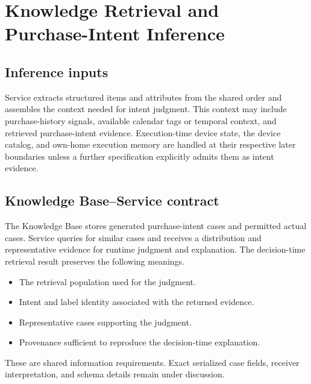 \section{Knowledge Retrieval and Purchase-Intent Inference}
\label{sec:inference}

\subsection{Inference inputs}

Service extracts structured items and attributes from the shared order and
assembles the context needed for intent judgment. This context may include
purchase-history signals, available calendar tags or temporal context, and
retrieved purchase-intent evidence. Execution-time device state, the device
catalog, and own-home execution memory are handled at their respective later
boundaries unless a further specification explicitly admits them as intent
evidence. 

\subsection{Knowledge Base--Service contract}

The Knowledge Base stores generated purchase-intent cases and permitted
actual cases. Service queries for similar cases and receives a distribution
and representative evidence for runtime judgment and explanation. The
decision-time retrieval result preserves the following meanings.

\begin{itemize}
  \item The retrieval population used for the judgment.
  \item Intent and label identity associated with the returned evidence.
  \item Representative cases supporting the judgment.
  \item Provenance sufficient to reproduce the decision-time explanation.
\end{itemize}

These are shared information requirements. Exact serialized case fields,
receiver interpretation, and schema details remain under discussion.



